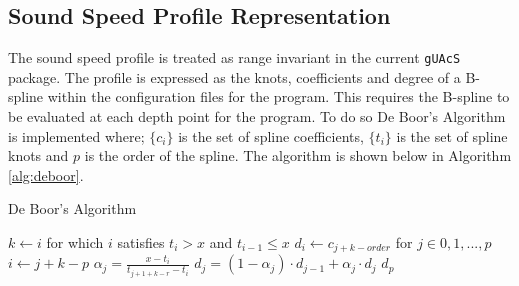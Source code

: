 \documentclass{article}
\begin{document}
\subsection{Sound Speed Profile Representation}
The sound speed profile is treated as range invariant in the current \texttt{gUAcS} package. The profile is expressed as the knots, coefficients and degree of a B-spline within the configuration files for the program. This requires the B-spline to be evaluated at each depth point for the program. To do so De Boor's Algorithm is implemented where; $\{c_{i}\}$ is the set of spline coefficients, $\{t_{i}\}$ is the set of spline knots and $p$ is the order of the spline. The algorithm is shown below in Algorithm \ref{alg:deboor}.
\begin{algorithm}[H]
	\label{alg:deboor}
	\caption{De Boor's Algorithm}
	\begin{algorithmic}
		\State $k\gets i$ for which $i$ satisfies $t_{i} > x$ and $t_{i-1} \leq x$
		\State $d_i\gets c_{j + k -order}$ for $j\in{0,1,...,p}$
		\State $i\gets j + k - p$
		\State $\alpha_j = \frac{x - t_i}{t_{j + 1 + k - r} - t_{i}}$
		\State $d_j = (1 - \alpha_j)\cdot d_{j-1} + \alpha_j\cdot d_{j}$
		\EndFor
		\EndFor
		\Return $d_{p}$
	\end{algorithmic}
\end{algorithm}


\nocite{*}
\printbibliography
\end{document}
